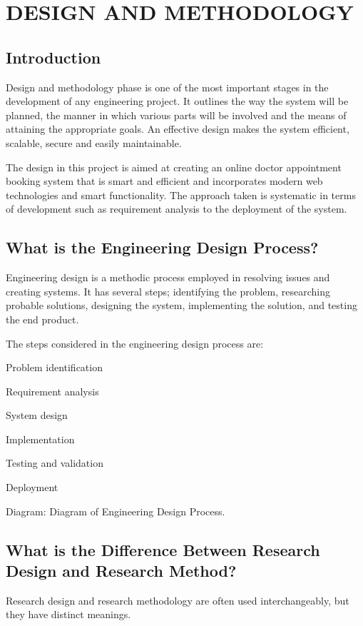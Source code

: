 \chapter{DESIGN AND METHODOLOGY}

\section{Introduction}

Design and methodology phase is one of the most important stages in the development of any engineering project. It outlines the way the system will be planned, the manner in which various parts will be involved and the means of attaining the appropriate goals. An effective design makes the system efficient, scalable, secure and easily maintainable.

The design in this project is aimed at creating an online doctor appointment booking system that is smart and efficient and incorporates modern web technologies and smart functionality. The approach taken is systematic in terms of development such as requirement analysis to the deployment of the system.

\section{What is the Engineering Design Process?}

Engineering design is a methodic process employed in resolving issues and creating systems. It has several steps; identifying the problem, researching probable solutions, designing the system, implementing the solution, and testing the end product.

The steps considered in the engineering design process are:

Problem identification

Requirement analysis

System design

Implementation

Testing and validation

Deployment

Diagram: Diagram of Engineering Design Process.

\section{What is the Difference Between Research Design and Research Method?}

Research design and research methodology are often used interchangeably, but they have distinct meanings.

